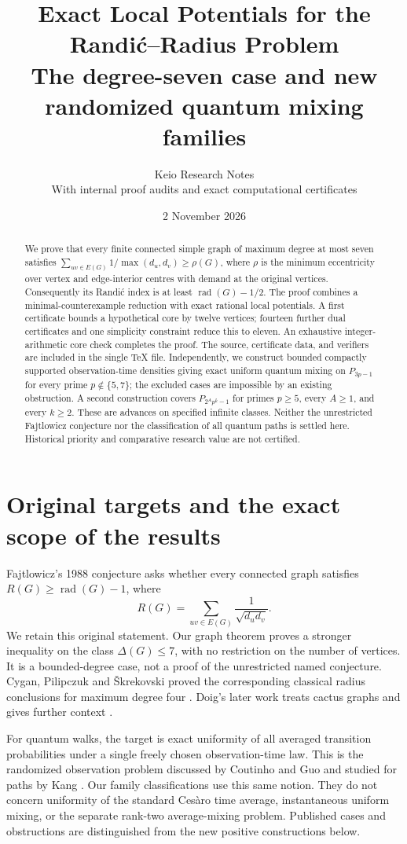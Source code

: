 \documentclass[11pt,a4paper]{article}
\title{Exact Local Potentials for the Randi\'c--Radius Problem\\[5pt]
\large The degree-seven case and new randomized quantum mixing families}
\author{Keio Research Notes\\\small With internal proof audits and exact computational certificates}
\date{2 November 2026}
\theoremstyle{definition}\newtheorem{definition}[theorem]{Definition}
\theoremstyle{remark}\newtheorem{remark}[theorem]{Remark}
\DeclareMathOperator{\rad}{rad}
\begin{document}
\maketitle
\begin{abstract}
We prove that every finite connected simple graph of maximum degree at
most seven satisfies
\(\sum_{uv\in E(G)}1/\max(d_u,d_v)\ge\rho(G)\), where
\(\rho\) is the minimum eccentricity over vertex and edge-interior
centres with demand at the original vertices. Consequently its
Randi\'c index is at least \(\rad(G)-1/2\). The proof combines a
minimal-counterexample reduction with exact rational local potentials.
A first certificate bounds a hypothetical core by twelve vertices;
fourteen further dual certificates and one simplicity constraint reduce
this to eleven. An exhaustive integer-arithmetic core check completes
the proof. The source, certificate data, and verifiers are included in
the single TeX file.
Independently, we construct bounded compactly supported observation-time
densities giving exact uniform quantum mixing on \(P_{3p-1}\) for
every prime \(p\notin\{5,7\}\); the excluded cases are impossible
by an existing obstruction. A second construction covers
\(P_{2^A p^k-1}\) for primes \(p\ge5\), every \(A\ge1\), and
every \(k\ge2\).
These are advances on specified infinite classes. Neither the unrestricted
Fajtlowicz conjecture nor the classification of all quantum paths is
settled here. Historical priority and comparative research value are
not certified.
\end{abstract}

\section{Original targets and the exact scope of the results}
Fajtlowicz's 1988 conjecture asks whether every connected graph satisfies
\(R(G)\ge\rad(G)-1\), where
\[
 R(G)=\sum_{uv\in E(G)}\frac1{\sqrt{d_ud_v}}.
\]
We retain this original statement. Our graph theorem proves a stronger
inequality on the class \(\Delta(G)\le7\), with no restriction on the
number of vertices. It is a bounded-degree case, not a proof of the
unrestricted named conjecture. Cygan, Pilipczuk and \v{S}krekovski proved
the corresponding classical radius conclusions for maximum degree four
\cite{CPS}. Doig's later work treats cactus graphs and gives further
context \cite{Doig2023}.

For quantum walks, the target is exact uniformity of all averaged
transition probabilities under a single freely chosen observation-time
law. This is the randomized observation problem discussed by
Coutinho and Guo \cite{CoutinhoGuo2024} and studied for paths by Kang
\cite{Kang2026}. Our family classifications use this same notion.
They do not concern uniformity of the standard Ces\`aro time average,
instantaneous uniform mixing, or the separate rank-two average-mixing
problem. Published cases and obstructions are distinguished from the
new positive constructions below.
\end{document}
